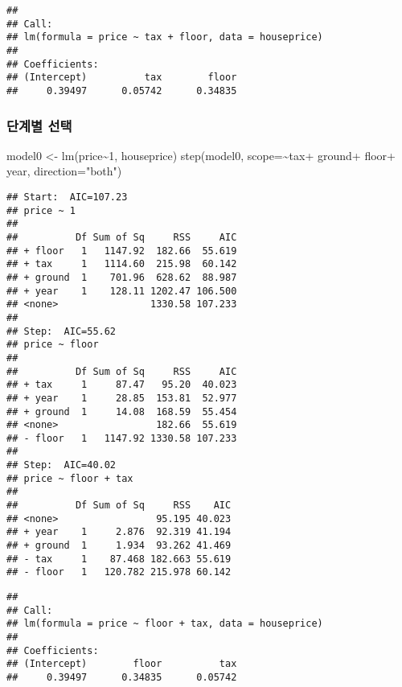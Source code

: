 \documentclass[
]{book}
\newenvironment{Shaded}{\begin{snugshade}}{\end{snugshade}}
\newcommand{\AttributeTok}[1]{\textcolor[rgb]{0.77,0.63,0.00}{#1}}
\newcommand{\DecValTok}[1]{\textcolor[rgb]{0.00,0.00,0.81}{#1}}
\newcommand{\FunctionTok}[1]{\textcolor[rgb]{0.00,0.00,0.00}{#1}}
\newcommand{\NormalTok}[1]{#1}
\newcommand{\OtherTok}[1]{\textcolor[rgb]{0.56,0.35,0.01}{#1}}
\newcommand{\SpecialCharTok}[1]{\textcolor[rgb]{0.00,0.00,0.00}{#1}}
\newcommand{\StringTok}[1]{\textcolor[rgb]{0.31,0.60,0.02}{#1}}
\begin{document}
\begin{verbatim}
## 
## Call:
## lm(formula = price ~ tax + floor, data = houseprice)
## 
## Coefficients:
## (Intercept)          tax        floor  
##     0.39497      0.05742      0.34835
\end{verbatim}

\hypertarget{uxb2e8uxacc4uxbcc4-uxc120uxd0dd}{%
\subsubsection{단계별 선택}\label{uxb2e8uxacc4uxbcc4-uxc120uxd0dd}}

\begin{Shaded}
\begin{Highlighting}[]
\NormalTok{model0 }\OtherTok{\textless{}{-}} \FunctionTok{lm}\NormalTok{(price}\SpecialCharTok{\textasciitilde{}}\DecValTok{1}\NormalTok{, houseprice)}
\FunctionTok{step}\NormalTok{(model0,  }\AttributeTok{scope=}\SpecialCharTok{\textasciitilde{}}\NormalTok{tax}\SpecialCharTok{+}\NormalTok{ ground}\SpecialCharTok{+}\NormalTok{ floor}\SpecialCharTok{+}\NormalTok{ year, }\AttributeTok{direction=}\StringTok{"both"}\NormalTok{)}
\end{Highlighting}
\end{Shaded}

\begin{verbatim}
## Start:  AIC=107.23
## price ~ 1
## 
##          Df Sum of Sq     RSS     AIC
## + floor   1   1147.92  182.66  55.619
## + tax     1   1114.60  215.98  60.142
## + ground  1    701.96  628.62  88.987
## + year    1    128.11 1202.47 106.500
## <none>                1330.58 107.233
## 
## Step:  AIC=55.62
## price ~ floor
## 
##          Df Sum of Sq     RSS     AIC
## + tax     1     87.47   95.20  40.023
## + year    1     28.85  153.81  52.977
## + ground  1     14.08  168.59  55.454
## <none>                 182.66  55.619
## - floor   1   1147.92 1330.58 107.233
## 
## Step:  AIC=40.02
## price ~ floor + tax
## 
##          Df Sum of Sq     RSS    AIC
## <none>                 95.195 40.023
## + year    1     2.876  92.319 41.194
## + ground  1     1.934  93.262 41.469
## - tax     1    87.468 182.663 55.619
## - floor   1   120.782 215.978 60.142
\end{verbatim}

\begin{verbatim}
## 
## Call:
## lm(formula = price ~ floor + tax, data = houseprice)
## 
## Coefficients:
## (Intercept)        floor          tax  
##     0.39497      0.34835      0.05742
\end{verbatim}
\end{document}
